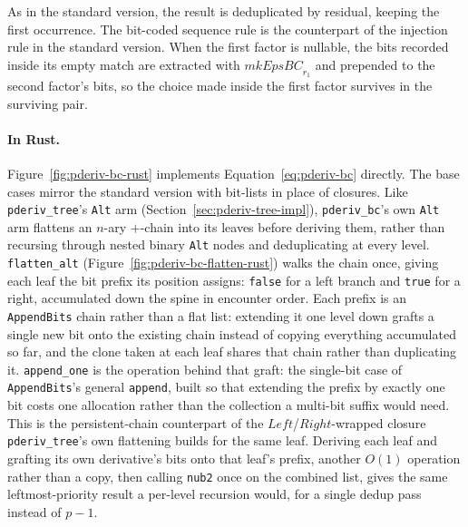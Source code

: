 As in the standard version, 
the result is deduplicated by residual, keeping the first occurrence.
The bit-coded sequence rule is the counterpart 
of the injection rule in the standard version. 
When the first factor is nullable, 
the bits recorded inside its empty match are extracted 
with $\mathit{mkEpsBC}_{r_1}$ and prepended to the second factor's bits, 
so the choice made inside the first factor survives in the surviving pair.

%

\paragraph{In Rust.}
\label{sec:pderiv-bc-impl}

Figure~\ref{fig:pderiv-bc-rust} implements Equation~\eqref{eq:pderiv-bc} directly.
The base cases mirror the standard version with bit-lists in place
of closures. Like \texttt{pderiv\_tree}'s \texttt{Alt} arm
(Section~\ref{sec:pderiv-tree-impl}), \texttt{pderiv\_bc}'s own
\texttt{Alt} arm flattens an $n$-ary $+$-chain into its leaves before
deriving them, rather than recursing through nested binary
\texttt{Alt} nodes and deduplicating at every level.
\texttt{flatten\_alt} (Figure~\ref{fig:pderiv-bc-flatten-rust}) walks
the chain once, giving each leaf the bit prefix its position assigns:
\texttt{false} for a left branch and \texttt{true} for a right,
accumulated down the spine in encounter order. Each prefix is an
\texttt{AppendBits} chain rather than a flat list: extending it one
level down grafts a single new bit onto the existing chain instead of
copying everything accumulated so far, and the clone taken at each
leaf shares that chain rather than duplicating it.
\texttt{append\_one} is the operation behind that graft: the
single-bit case of \texttt{AppendBits}'s general \texttt{append},
built so that extending the prefix by exactly one bit costs one
allocation rather than the collection a multi-bit suffix would need.
This is the persistent-chain counterpart of the $\mathit{Left}$/$\mathit{Right}$-wrapped
closure \texttt{pderiv\_tree}'s own flattening builds for the same leaf.
Deriving each leaf and grafting its own derivative's bits onto that
leaf's prefix, another $O(1)$ operation rather than a copy, then
calling \texttt{nub2} once on the combined list, gives the same
leftmost-priority result a per-level recursion would, for a single
dedup pass instead of $p - 1$.

